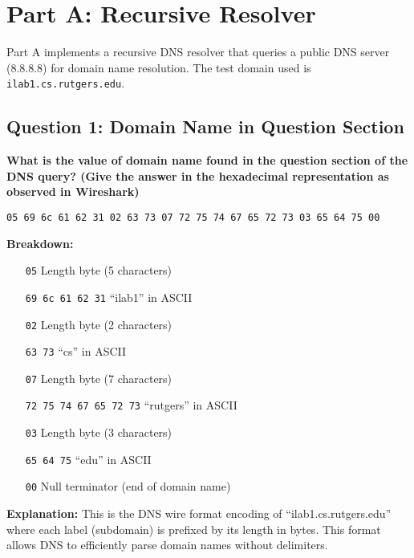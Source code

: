 \documentclass[11pt,letterpaper]{article}
\begin{document}
\newpage

\section{Part A: Recursive Resolver}

Part A implements a recursive DNS resolver that queries a public DNS server (8.8.8.8) for domain name resolution. The test domain used is \texttt{ilab1.cs.rutgers.edu}.

\subsection{Question 1: Domain Name in Question Section}

\textbf{What is the value of domain name found in the question section of the DNS query? (Give the answer in the hexadecimal representation as observed in Wireshark)}

\begin{hexbox}
\begin{lstlisting}[style=hexstyle]
05 69 6c 61 62 31 02 63 73 07 72 75 74 67 65 72 73 03 65 64 75 00
\end{lstlisting}
\end{hexbox}

\textbf{Breakdown:}
\begin{itemize}[leftmargin=2cm]
    \item[\texttt{05}] Length byte (5 characters)
    \item[\texttt{69 6c 61 62 31}] ``ilab1'' in ASCII
    \item[\texttt{02}] Length byte (2 characters)
    \item[\texttt{63 73}] ``cs'' in ASCII
    \item[\texttt{07}] Length byte (7 characters)
    \item[\texttt{72 75 74 67 65 72 73}] ``rutgers'' in ASCII
    \item[\texttt{03}] Length byte (3 characters)
    \item[\texttt{65 64 75}] ``edu'' in ASCII
    \item[\texttt{00}] Null terminator (end of domain name)
\end{itemize}

\textbf{Explanation:} This is the DNS wire format encoding of ``ilab1.cs.rutgers.edu'' where each label (subdomain) is prefixed by its length in bytes. This format allows DNS to efficiently parse domain names without delimiters.
\end{document}
